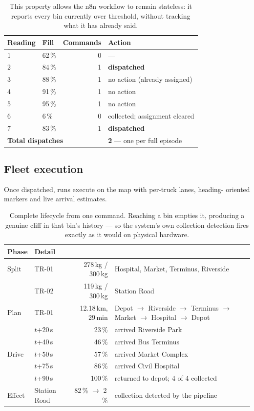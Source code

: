 \documentclass[11pt,a4paper]{article}
\begin{document}
\begin{table}[h]
\centering\small
\begin{tabular}{llrl}
\toprule
\textbf{Reading} & \textbf{Fill} & \textbf{Commands} & \textbf{Action} \\
\midrule
1 & 62\,\% & 0 & --- \\
2 & 84\,\% & 1 & \textcolor{low}{\textbf{dispatched}} \\
3 & 88\,\% & 1 & no action (already assigned) \\
4 & 91\,\% & 1 & no action \\
5 & 95\,\% & 1 & no action \\
6 & \phantom{0}6\,\% & 0 & collected; assignment cleared \\
7 & 83\,\% & 1 & \textcolor{low}{\textbf{dispatched}} \\
\midrule
\multicolumn{3}{l}{\textbf{Total dispatches}} & \textbf{2} --- one per full episode \\
\bottomrule
\end{tabular}
\caption{This property allows the n8n workflow to remain stateless: it
reports every bin currently over threshold, without tracking what it has
already said.}
\end{table}

\subsection{Fleet execution}

Once dispatched, runs execute on the map with per-truck lanes, heading-
oriented markers and live arrival estimates.

\begin{table}[h]
\centering\small
\begin{tabular}{llrl}
\toprule
\textbf{Phase} & \textbf{Detail} & & \\
\midrule
Split   & TR-01 & 278\,kg / 300\,kg & Hospital, Market, Terminus, Riverside \\
        & TR-02 & 119\,kg / 300\,kg & Station Road \\
\midrule
Plan    & TR-01 & 12.18\,km, 29\,min & Depot $\rightarrow$ Riverside $\rightarrow$ Terminus $\rightarrow$ Market $\rightarrow$ Hospital $\rightarrow$ Depot \\
\midrule
\multirow{5}{*}{Drive}
        & $t$+20\,s & 23\,\% & arrived Riverside Park \\
        & $t$+40\,s & 46\,\% & arrived Bus Terminus \\
        & $t$+50\,s & 57\,\% & arrived Market Complex \\
        & $t$+75\,s & 86\,\% & arrived Civil Hospital \\
        & $t$+90\,s & 100\,\% & returned to depot; 4 of 4 collected \\
\midrule
Effect  & Station Road & 82\,\% $\rightarrow$ 2\,\% & collection detected by the pipeline \\
\bottomrule
\end{tabular}
\caption{Complete lifecycle from one command. Reaching a bin empties it,
producing a genuine cliff in that bin's history --- so the system's own
collection detection fires exactly as it would on physical hardware.}
\end{table}
\end{document}
